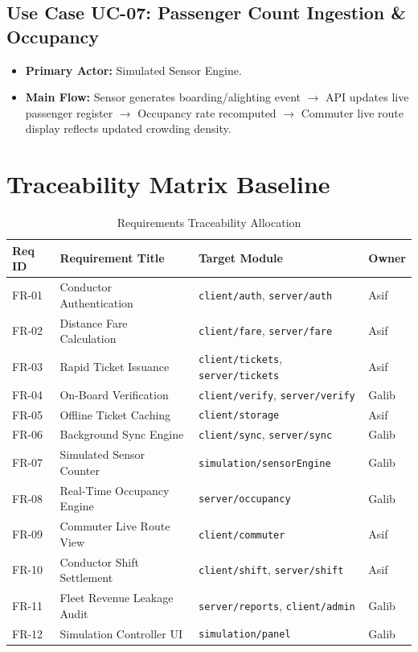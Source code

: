 \documentclass[11pt,a4paper]{article}
\begin{document}
\subsection{Use Case UC-07: Passenger Count Ingestion \& Occupancy}
\begin{itemize}[noitemsep]
    \item \textbf{Primary Actor:} Simulated Sensor Engine.
    \item \textbf{Main Flow:} Sensor generates boarding/alighting event $\rightarrow$ API updates live passenger register $\rightarrow$ Occupancy rate recomputed $\rightarrow$ Commuter live route display reflects updated crowding density.
\end{itemize}

\section{Traceability Matrix Baseline}

\begin{table}[h]
\centering
\small
\renewcommand{\arraystretch}{1.2}
\begin{tabularx}{\textwidth}{@{}l X l l@{}}
\toprule
\textbf{Req ID} & \textbf{Requirement Title} & \textbf{Target Module} & \textbf{Owner} \\
\midrule
FR-01 & Conductor Authentication & \texttt{client/auth}, \texttt{server/auth} & Asif \\
FR-02 & Distance Fare Calculation & \texttt{client/fare}, \texttt{server/fare} & Asif \\
FR-03 & Rapid Ticket Issuance & \texttt{client/tickets}, \texttt{server/tickets} & Asif \\
FR-04 & On-Board Verification & \texttt{client/verify}, \texttt{server/verify} & Galib \\
FR-05 & Offline Ticket Caching & \texttt{client/storage} & Asif \\
FR-06 & Background Sync Engine & \texttt{client/sync}, \texttt{server/sync} & Galib \\
FR-07 & Simulated Sensor Counter & \texttt{simulation/sensorEngine} & Galib \\
FR-08 & Real-Time Occupancy Engine & \texttt{server/occupancy} & Galib \\
FR-09 & Commuter Live Route View & \texttt{client/commuter} & Asif \\
FR-10 & Conductor Shift Settlement & \texttt{client/shift}, \texttt{server/shift} & Asif \\
FR-11 & Fleet Revenue Leakage Audit & \texttt{server/reports}, \texttt{client/admin} & Galib \\
FR-12 & Simulation Controller UI & \texttt{simulation/panel} & Galib \\
\bottomrule
\end{tabularx}
\caption{Requirements Traceability Allocation}
\end{table}
\end{document}
